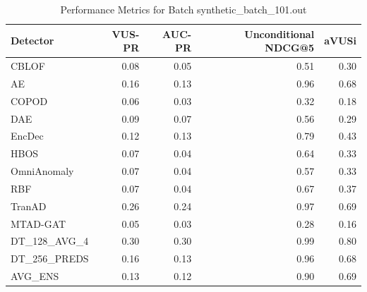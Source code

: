 \begin{table}
\centering
\caption{Performance Metrics for Batch synthetic_batch_101.out}
\label{tab:example_metrics}
\begin{tabular}{lrrrr}
\toprule
    Detector &  VUS-PR &  AUC-PR &  Unconditional NDCG@5 &  aVUSi \\
\midrule
       CBLOF &    0.08 &    0.05 &                  0.51 &   0.30 \\
          AE &    0.16 &    0.13 &                  0.96 &   0.68 \\
       COPOD &    0.06 &    0.03 &                  0.32 &   0.18 \\
         DAE &    0.09 &    0.07 &                  0.56 &   0.29 \\
      EncDec &    0.12 &    0.13 &                  0.79 &   0.43 \\
        HBOS &    0.07 &    0.04 &                  0.64 &   0.33 \\
 OmniAnomaly &    0.07 &    0.04 &                  0.57 &   0.33 \\
         RBF &    0.07 &    0.04 &                  0.67 &   0.37 \\
      TranAD &    0.26 &    0.24 &                  0.97 &   0.69 \\
    MTAD-GAT &    0.05 &    0.03 &                  0.28 &   0.16 \\
DT\_128\_AVG\_4 &    0.30 &    0.30 &                  0.99 &   0.80 \\
DT\_256\_PREDS &    0.16 &    0.13 &                  0.96 &   0.68 \\
     AVG\_ENS &    0.13 &    0.12 &                  0.90 &   0.69 \\
\bottomrule
\end{tabular}
\end{table}
